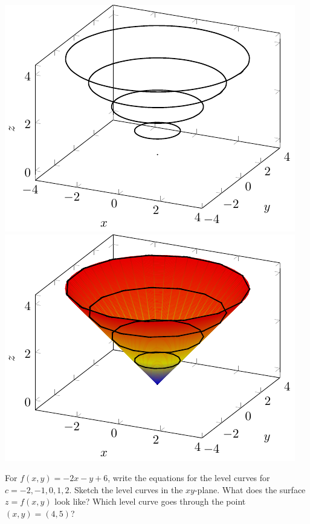 \begin{center}
    \includegraphics[scale=1]{tikz-pictures/section-9.1-again-pic4-level-curves-cone-2.pdf} 
    \hfill 
    \includegraphics[scale=1]{tikz-pictures/section-9.1-again-pic4-level-curves-cone-3.pdf}\label{img:tikz-cone}
\end{center}

\vspace{.5in}

\pagebreak

\begin{ex}
    For $f(x,y)=-2x-y+6$, write the equations for the level curves for $c=-2,-1,0,1,2$. Sketch the level curves in the $xy$-plane. What does the surface $z=f(x,y)$ look like? Which level curve goes through the point $(x,y)=(4,5)$?
\end{ex}

